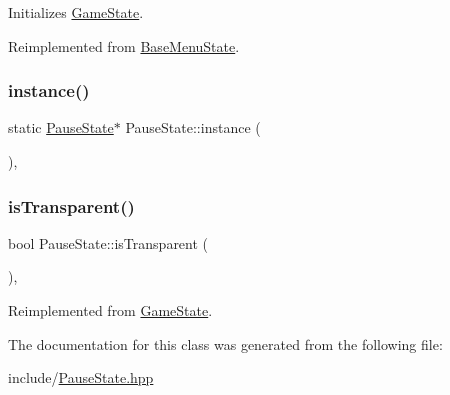 Initializes \mbox{\hyperlink{class_game_state}{Game\+State}}. 



Reimplemented from \mbox{\hyperlink{class_base_menu_state_ae29d522c56a4582ce79e113426421741}{Base\+Menu\+State}}.

\mbox{\label{class_pause_state_ab40142d0af977bf32195e9f734bb05f1}} 
\subsubsection{\texorpdfstring{instance()}{instance()}}
{\footnotesize\ttfamily static \mbox{\hyperlink{class_pause_state}{Pause\+State}}$\ast$ Pause\+State\+::instance (\begin{DoxyParamCaption}{ }\end{DoxyParamCaption})\hspace{0.3cm}{\ttfamily [inline]}, {\ttfamily [static]}}

\mbox{\label{class_pause_state_a1d8e1f454ead5881c3ad396798eb4ac1}} 
\subsubsection{\texorpdfstring{isTransparent()}{isTransparent()}}
{\footnotesize\ttfamily bool Pause\+State\+::is\+Transparent (\begin{DoxyParamCaption}{ }\end{DoxyParamCaption})\hspace{0.3cm}{\ttfamily [inline]}, {\ttfamily [virtual]}}



Reimplemented from \mbox{\hyperlink{class_game_state_af75d6db30190901ed70704d18804fac7}{Game\+State}}.



The documentation for this class was generated from the following file\+:\begin{DoxyCompactItemize}
\item 
include/\mbox{\hyperlink{_pause_state_8hpp}{Pause\+State.\+hpp}}\end{DoxyCompactItemize}
